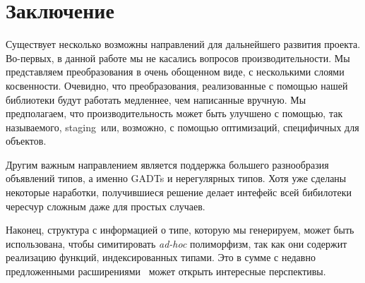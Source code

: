 \section{Заключение}
\label{sec:futurework}

Существует несколько возможны направлений для дальнейшего развития проекта. Во-первых, в данной работе мы не касались вопросов производительности. Мы представляем преобразования в очень обощенном виде, с несколькими слоями косвенности. Очевидно, что преобразования, реализованные с помощью нашей библиотеки будут работать медленнее, чем написанные вручную. Мы предполагаем, что производительность может быть
улучшено с помощью, так называемого, staging~\cite{Staged}или, возможно, с помощью оптимизаций, специфичных для объектов.

Другим важным направлением является поддержка большего разнообразия объявлений типов, а именно GADTs и нерегулярных типов. Хотя уже сделаны некоторые наработки, получившиеся решение делает интефейс всей бибилотеки чересчур сложным даже для простых случаев.

Наконец, структура с информацией о типе, которую мы генерируем, может быть использована, чтобы симитировать \emph{ad-hoc} полиморфизм, так как они содержит реализацию функций, индексированных типами. Это в сумме с недавно предложенными расширениями~\cite{ModularImplicits} может открыть интересные перспективы.

